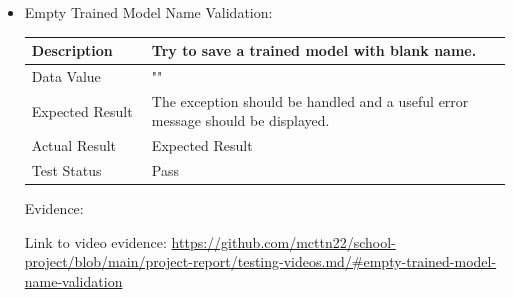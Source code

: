 \documentclass[./project-report/src/latex/project-report.tex]{subfiles}
\begin{document}
\begin{itemize}
\begin{itemize}
        \pagebreak
        
        \item Empty Trained Model Name Validation: \newline\newline
			\begin{tabular}{|p{0.25\linewidth}|p{0.75\linewidth}|}
				\hline
				Description & Try to save a trained model with blank name. \\
				\hline
				Data Value & "" \\
				\hline
				Expected Result & The exception should be handled and a useful error message should be displayed. \\
				\hline
				Actual Result & Expected Result \\
				\hline
				Test Status & Pass \\
				\hline
			\end{tabular}

			\vspace{5mm}

            Evidence:
			\begin{figure}[h!]
			\centering
			\end{figure}

			Link to video evidence: \url{https://github.com/mcttn22/school-project/blob/main/project-report/testing-videos.md/#empty-trained-model-name-validation}

		\pagebreak


\end{itemize}
\end{itemize}
\end{document}
